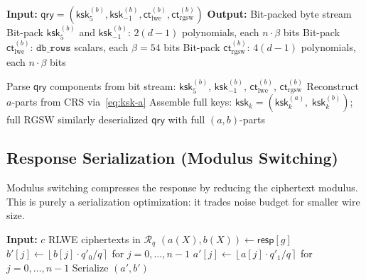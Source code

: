 \documentclass[11pt,a4paper]{article}
\newcommand{\R}{\mathcal{R}}
\newcommand{\Rq}{\R_{q}}
\newcommand{\round}[1]{\left\lfloor #1 \right\rceil}
\begin{document}
\begin{algorithm}[H]
\caption{$\textsc{SerializeQuery}(\mathsf{qry})$}
\label{alg:serialize-query}
\begin{algorithmic}[1]
\State \textbf{Input:} $\mathsf{qry} = (\mathsf{ksk}_5^{(b)}, \mathsf{ksk}_{-1}^{(b)}, \mathsf{ct}_{\mathrm{lwe}}^{(b)}, \mathsf{ct}_{\mathrm{rgsw}}^{(b)})$
\State \textbf{Output:} Bit-packed byte stream
\State {}
\State Bit-pack $\mathsf{ksk}_5^{(b)}$ and $\mathsf{ksk}_{-1}^{(b)}$: $2(d\!-\!1)$ polynomials, each $n \cdot \beta$ bits
\Statex
\State {}
\State Bit-pack $\mathsf{ct}_{\mathrm{lwe}}^{(b)}$: $\texttt{db\_rows}$ scalars, each $\beta = 54$ bits
\Statex
\State {}
\State Bit-pack $\mathsf{ct}_{\mathrm{rgsw}}^{(b)}$: $4(d\!-\!1)$ polynomials, each $n \cdot \beta$ bits
\end{algorithmic}
\end{algorithm}

\begin{algorithm}[H]
\caption{$\textsc{DeserializeQuery}(\mathsf{pp}, \texttt{bytes})$: Server-side.}
\label{alg:deserialize-query}
\begin{algorithmic}[1]
\State Parse $\mathsf{qry}$ components from bit stream: $\mathsf{ksk}_5^{(b)}$, $\mathsf{ksk}_{-1}^{(b)}$, $\mathsf{ct}_{\mathrm{lwe}}^{(b)}$, $\mathsf{ct}_{\mathrm{rgsw}}^{(b)}$
\State Reconstruct $a$-parts from CRS via~\eqref{eq:ksk-a}
\State Assemble full keys: $\mathsf{ksk}_k = (\mathsf{ksk}_k^{(a)},\; \mathsf{ksk}_k^{(b)})$; full RGSW similarly
\State \Return deserialized $\mathsf{qry}$ with full $(a,b)$-parts
\end{algorithmic}
\end{algorithm}

\subsection{Response Serialization (Modulus Switching)}\label{sec:serialize-response}

Modulus switching compresses the response by reducing the ciphertext modulus.
This is purely a serialization optimization: it trades noise budget for smaller wire size.

\begin{algorithm}[H]
\caption{$\textsc{SerializeResponse}(\mathsf{resp})$: Server-side, applied after $\textsc{Answer}$.}
\label{alg:serialize-response}
\begin{algorithmic}[1]
\State \textbf{Input:} $c$ RLWE ciphertexts in $\Rq$
    \State $(a(X), b(X)) \gets \mathsf{resp}[g]$
    \State $b'[j] \gets \round{b[j] \cdot q'_0 / q}$ for $j = 0, \ldots, n-1$ 
    \State $a'[j] \gets \round{a[j] \cdot q'_1 / q}$ for $j = 0, \ldots, n-1$ 
    \State Serialize $(a', b')$
\EndFor
\end{algorithmic}
\end{algorithm}
\end{document}

